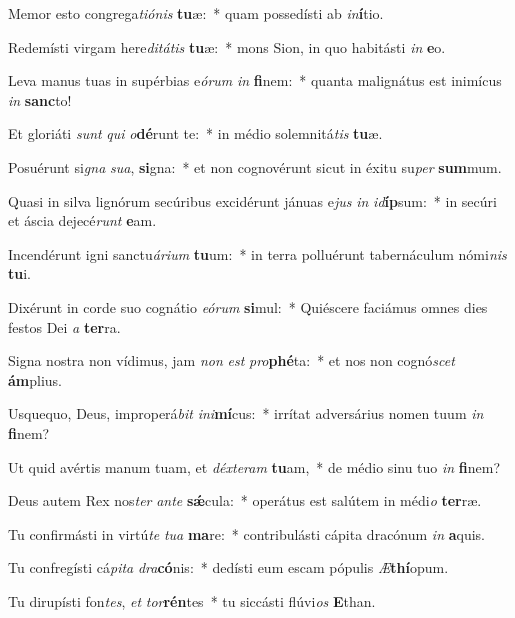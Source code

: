 \item Memor esto congrega\textit{ti}\textit{ó}\textit{nis} \textbf{tu}æ:~* quam possedísti ab \textit{in}\textbf{í}tio.
\item Redemísti virgam here\textit{di}\textit{tá}\textit{tis} \textbf{tu}æ:~* mons Sion, in quo habitásti \textit{in} \textbf{e}o.
\item Leva manus tuas in supérbias e\textit{ó}\textit{rum} \textit{in} \textbf{fi}nem:~* quanta malignátus est inimícus \textit{in} \textbf{sanc}to!
\item Et gloriáti \textit{sunt} \textit{qui} \textit{o}\textbf{dé}runt te:~* in médio solemnitá\textit{tis} \textbf{tu}æ.
\item Posuérunt si\textit{gna} \textit{su}\textit{a}, \textbf{si}gna:~* et non cognovérunt sicut in éxitu su\textit{per} \textbf{sum}mum.
\item Quasi in silva lignórum secúribus excidérunt jánuas e\textit{jus} \textit{in} \textit{id}\textbf{íp}sum:~* in secúri et áscia dejecé\textit{runt} \textbf{e}am.
\item Incendérunt igni sanctu\textit{á}\textit{ri}\textit{um} \textbf{tu}um:~* in terra polluérunt tabernáculum nómi\textit{nis} \textbf{tu}i.
\item Dixérunt in corde suo cognátio \textit{e}\textit{ó}\textit{rum} \textbf{si}mul:~* Quiéscere faciámus omnes dies festos Dei \textit{a} \textbf{ter}ra.
\item Signa nostra non vídimus, jam \textit{non} \textit{est} \textit{pro}\textbf{phé}ta:~* et nos non cognó\textit{scet} \textbf{ám}plius.
\item Usquequo, Deus, improperá\textit{bit} \textit{in}\textit{i}\textbf{mí}cus:~* irrítat adversárius nomen tuum \textit{in} \textbf{fi}nem?
\item Ut quid avértis manum tuam, et \textit{déx}\textit{te}\textit{ram} \textbf{tu}am,~* de médio sinu tuo \textit{in} \textbf{fi}nem?
\item Deus autem Rex nos\textit{ter} \textit{an}\textit{te} \textbf{sǽ}cula:~* operátus est salútem in médi\textit{o} \textbf{ter}ræ.
\item Tu confirmásti in virtú\textit{te} \textit{tu}\textit{a} \textbf{ma}re:~* contribulásti cápita dracónum \textit{in} \textbf{a}quis.
\item Tu confregísti cá\textit{pi}\textit{ta} \textit{dra}\textbf{có}nis:~* dedísti eum escam pópulis \textit{Æ}\textbf{thí}opum.
\item Tu dirupísti fon\textit{tes}, \textit{et} \textit{tor}\textbf{rén}tes~* tu siccásti flúvi\textit{os} \textbf{E}than.
